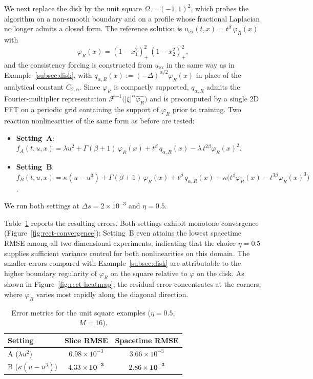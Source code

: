 \documentclass[a4paper,fleqn]{cas-sc}
\begin{document}
We next replace the disk by the unit square $\Omega=(-1,1)^2$, which probes
the algorithm on a non-smooth boundary and on a profile whose fractional
Laplacian no longer admits a closed form. The reference solution is
$u_{\mathrm{ex}}(t,x)=t^\beta\,\varphi_R(x)$ with
\begin{equation}\label{eq:phi-rect}
\varphi_R(x) = (1-x_1^2)_+^2\,(1-x_2^2)_+^2,
\end{equation}
and the consistency forcing is constructed from $u_{\mathrm{ex}}$ in the
same way as in Example~\ref{subsec:disk}, with
$q_{\alpha,R}(x):=(-\Delta)^{\alpha/2}\varphi_R(x)$ in place of the
analytical constant $C_{2,\alpha}$. Since $\varphi_R$ is compactly supported,
$q_{\alpha,R}$ admits the Fourier-multiplier representation
$\mathcal{F}^{-1}\bigl(|\xi|^\alpha\widehat{\varphi_R}\bigr)$ and is
precomputed by a single 2D FFT on a periodic grid containing the support of
$\varphi_R$ prior to training. Two reaction nonlinearities of the same form
as before are tested:
\begin{itemize}
\item \textbf{Setting~A}: $f_A(t,u,x) = \lambda u^2 + \Gamma(\beta{+}1)\,\varphi_R(x) + t^\beta\,q_{\alpha,R}(x) - \lambda\,t^{2\beta}\varphi_R(x)^2$.
\item \textbf{Setting~B}: $f_B(t,u,x) = \kappa(u-u^3) + \Gamma(\beta{+}1)\,\varphi_R(x) + t^\beta\,q_{\alpha,R}(x) - \kappa\bigl(t^\beta\varphi_R(x) - t^{3\beta}\varphi_R(x)^3\bigr)$.
\end{itemize}
We run both settings at $\Delta s=2\times 10^{-3}$ and $\eta=0.5$.

Table~\ref{tab:rect-results} reports the resulting errors. Both settings exhibit monotone convergence
(Figure~\ref{fig:rect-convergence}); Setting~B even attains the lowest
spacetime RMSE among all two-dimensional experiments, indicating that the
choice $\eta=0.5$ supplies sufficient variance control for both
nonlinearities on this domain. The smaller errors compared with Example~\ref{subsec:disk} are attributable
to the higher boundary regularity of $\varphi_R$ on the square relative to
$\varphi$ on the disk. As shown in Figure~\ref{fig:rect-heatmap}, the
residual error concentrates at the corners, where $\varphi_R$ varies most
rapidly along the diagonal direction.

\begin{table}[pos=htbp]
\centering
\caption{Error metrics for the unit square examples ($\eta=0.5$, $M=16$).}
\label{tab:rect-results}
\begin{tabular}{lcc}
\toprule
Setting & Slice RMSE & Spacetime RMSE \\
\midrule
A ($\lambda u^2$) & $6.98\times 10^{-3}$ & $3.66\times 10^{-3}$ \\
B ($\kappa(u-u^3)$) & $\mathbf{4.33\times 10^{-3}}$ & $\mathbf{2.86\times 10^{-3}}$ \\
\bottomrule
\end{tabular}
\end{table}
\end{document}
